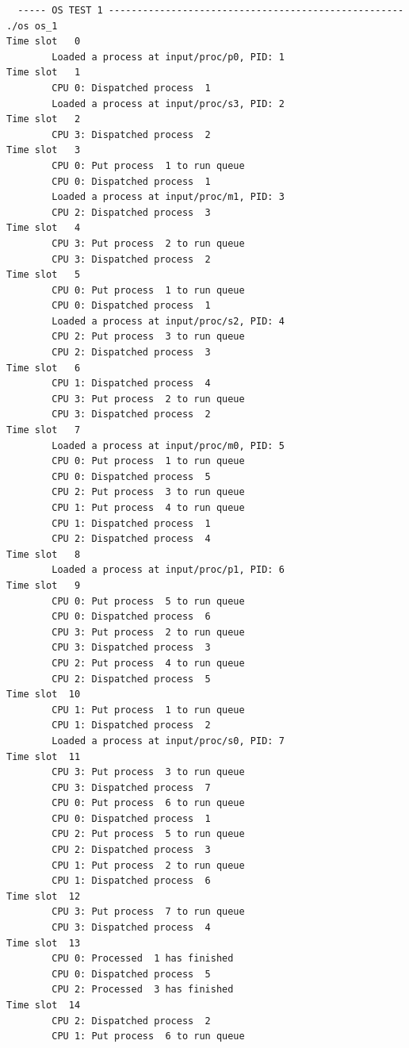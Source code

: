 \documentclass[a4paper]{article}
\numberwithin{equation}{section}
\begin{document}
\begin{mdframed}[leftline=false,rightline=false,backgroundcolor=grey!10,nobreak=false]
  \begin{verbatim}
  ----- OS TEST 1 ----------------------------------------------------
./os os_1
Time slot   0
        Loaded a process at input/proc/p0, PID: 1
Time slot   1
        CPU 0: Dispatched process  1
        Loaded a process at input/proc/s3, PID: 2
Time slot   2
        CPU 3: Dispatched process  2
Time slot   3
        CPU 0: Put process  1 to run queue
        CPU 0: Dispatched process  1
        Loaded a process at input/proc/m1, PID: 3
        CPU 2: Dispatched process  3
Time slot   4
        CPU 3: Put process  2 to run queue
        CPU 3: Dispatched process  2
Time slot   5
        CPU 0: Put process  1 to run queue
        CPU 0: Dispatched process  1
        Loaded a process at input/proc/s2, PID: 4
        CPU 2: Put process  3 to run queue
        CPU 2: Dispatched process  3
Time slot   6
        CPU 1: Dispatched process  4
        CPU 3: Put process  2 to run queue
        CPU 3: Dispatched process  2
Time slot   7
        Loaded a process at input/proc/m0, PID: 5
        CPU 0: Put process  1 to run queue
        CPU 0: Dispatched process  5
        CPU 2: Put process  3 to run queue
        CPU 1: Put process  4 to run queue
        CPU 1: Dispatched process  1
        CPU 2: Dispatched process  4
Time slot   8
        Loaded a process at input/proc/p1, PID: 6
Time slot   9
        CPU 0: Put process  5 to run queue
        CPU 0: Dispatched process  6
        CPU 3: Put process  2 to run queue
        CPU 3: Dispatched process  3
        CPU 2: Put process  4 to run queue
        CPU 2: Dispatched process  5
Time slot  10
        CPU 1: Put process  1 to run queue
        CPU 1: Dispatched process  2
        Loaded a process at input/proc/s0, PID: 7
Time slot  11
        CPU 3: Put process  3 to run queue
        CPU 3: Dispatched process  7
        CPU 0: Put process  6 to run queue
        CPU 0: Dispatched process  1
        CPU 2: Put process  5 to run queue
        CPU 2: Dispatched process  3
        CPU 1: Put process  2 to run queue
        CPU 1: Dispatched process  6
Time slot  12
        CPU 3: Put process  7 to run queue
        CPU 3: Dispatched process  4
Time slot  13
        CPU 0: Processed  1 has finished
        CPU 0: Dispatched process  5
        CPU 2: Processed  3 has finished
Time slot  14
        CPU 2: Dispatched process  2
        CPU 1: Put process  6 to run queue

\end{verbatim}
\end{mdframed}
\end{document}
